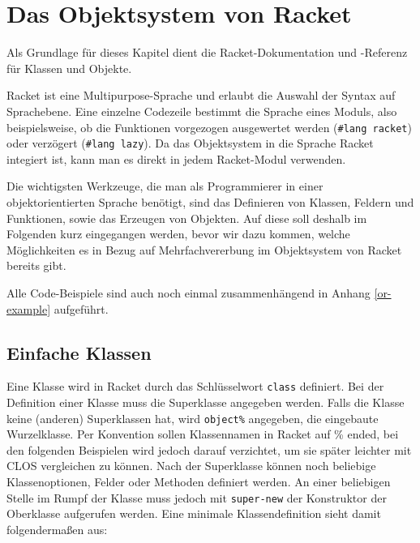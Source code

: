 
\section{Das Objektsystem von Racket}
Als Grundlage für dieses Kapitel dient die Racket-Dokumentation \cite{racketguide-classes} und -Referenz \cite{racketref-classes} für Klassen und Objekte.

Racket ist eine Multipurpose-Sprache und erlaubt die Auswahl der Syntax auf Sprachebene. Eine einzelne Codezeile bestimmt die Sprache eines Moduls, also beispielsweise, ob die Funktionen vorgezogen ausgewertet werden (\texttt{\#lang racket}) oder verzögert (\texttt{\#lang lazy}). Da das Objektsystem in die Sprache Racket integiert ist, kann man es direkt in jedem Racket-Modul verwenden.


Die wichtigsten Werkzeuge, die man als Programmierer in einer objektorientierten Sprache benötigt, sind das Definieren von Klassen, Feldern und Funktionen, sowie das Erzeugen von Objekten. Auf diese soll deshalb im Folgenden kurz eingegangen werden, bevor wir dazu kommen, welche Möglichkeiten es in Bezug auf Mehrfachvererbung im Objektsystem von Racket bereits gibt.

Alle Code-Beispiele sind auch noch einmal zusammenhängend in Anhang \ref{or-example} aufgeführt. 

\subsection{Einfache Klassen}

Eine Klasse wird in Racket durch das Schlüsselwort \texttt{class} definiert. Bei der Definition einer Klasse muss die Superklasse angegeben werden. Falls die Klasse keine (anderen) Superklassen hat, wird \texttt{object\%} angegeben, die eingebaute Wurzelklasse. Per Konvention sollen Klassennamen in Racket auf \% ended, bei den folgenden Beispielen wird jedoch darauf verzichtet, um sie später leichter mit CLOS vergleichen zu können. Nach der Superklasse können noch beliebige Klassenoptionen, Felder oder Methoden definiert werden. An einer beliebigen Stelle im Rumpf der Klasse muss jedoch mit \texttt{super-new} der Konstruktor der Oberklasse aufgerufen werden. Eine minimale Klassendefinition sieht damit folgendermaßen aus:

